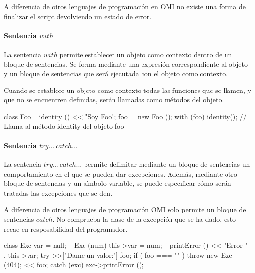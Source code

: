 A diferencia de otros lenguajes de programación en OMI no existe una forma de finalizar el script 
devolviendo un estado de error.

\paragraph{Sentencia $with$} \label{sec:stmt_with}

La sentencia $with$ permite establecer un objeto como contexto dentro de un bloque de sentencias. Se forma mediante
una expresión correspondiente al objeto y un bloque de sentencias que será ejecutada con el objeto como contexto. 

Cuando se establece un objeto como contexto todas las funciones que se llamen, y que no se encuentren definidas, serán 
llamadas como métodos del objeto. \\

\begin{myverbatim}
   class Foo {
      ~ identity () {
         << "Soy Foo";
      } 
   }
   foo = new Foo ();
   with (foo) {
      identity(); // Llama al método identity del objeto foo
   }
\end{myverbatim}

\paragraph{Sentencia $try...\ catch...$} \label{sec:stmt_try}

La sentencia $try...\ catch...$ permite delimitar mediante un bloque de sentencias 
un comportamiento en el que se pueden dar excepciones. Además, mediante otro 
bloque de sentencias y un símbolo variable, se puede especificar cómo serán tratadas
las excepciones que se den.

A diferencia de otros lenguajes de programación OMI solo permite un bloque de 
sentencias $catch$. No comprueba la clase de la excepción que se ha dado, esto recae
en resposabilidad del programador. \\

\begin{myverbatim}
   class Exc {
      var = null;
      ~ Exc (num) {
         this->var = num;
      }
      ~ printError () {
         << "Error " . this->var;
      }
   }
   try {
      >>["Dame un valor:"] foo;
      if ( foo === "" ){
         throw new Exc (404);
      } 
      << foo;
   }catch (exc) {
      exc->printError ();
   }
\end{myverbatim}

